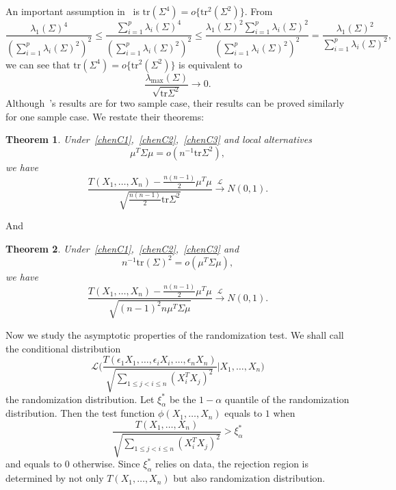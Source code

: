 \documentclass[review]{elsarticle}
\theoremstyle{plain}
\newtheorem{theorem}{\quad\quad Theorem}
\theoremstyle{definition}
\theoremstyle{remark}
\begin{document}
An important assumption in~\cite{Chen2010A} is
    $\mathrm{tr}(\Sigma^4)=o\{\mathrm{tr}^2(\Sigma^2)\}$.
    From
    $$
    \frac{\lambda_1(\Sigma)^4}{(\sum_{i=1}^p \lambda_i(\Sigma)^2)^2}
    \leq
    \frac{\sum_{i=1}^p\lambda_i(\Sigma)^4}{(\sum_{i=1}^p \lambda_i(\Sigma)^2)^2}
    \leq
    \frac{\lambda_1(\Sigma)^2\sum_{i=1}^p\lambda_i(\Sigma)^2}{(\sum_{i=1}^p \lambda_i(\Sigma)^2)^2}
    =
    \frac{\lambda_1(\Sigma)^2}{\sum_{i=1}^p \lambda_i(\Sigma)^2},
    $$
    we can see that 
    $\mathrm{tr}(\Sigma^4)=o\{\mathrm{tr}^2(\Sigma^2)\}$ is equivalent to
\begin{equation}\label{chenC3}
    \frac{\lambda_{\max}(\Sigma)}{\sqrt{\mathrm{tr}\Sigma^2}}\to 0.
\end{equation}
Although~\cite{Chen2010A}'s results are for two sample case, their results can be proved similarly for one sample case. We restate their theorems:
\begin{theorem}\label{theoremChen}
    Under~\eqref{chenC1},~\eqref{chenC2},~\eqref{chenC3} and local alternatives
    \begin{equation}\label{mu1}
        \mu^T \Sigma\mu=o(n^{-1}\mathrm{tr}\Sigma^2),
    \end{equation}
    we have
        $$
        \frac{T(X_1,\ldots,X_n)-\frac{n(n-1)}{2}\mu^T\mu}{\sqrt{\frac{n(n-1)}{2}\mathrm{tr}\Sigma^2}}\xrightarrow{\mathcal{L}}N(0,1).
        $$
\end{theorem}
And
\begin{theorem}\label{theoremChen2}
    Under~\eqref{chenC1},~\eqref{chenC2},~\eqref{chenC3} and     \begin{equation}\label{mumu1}
     n^{-1}\mathrm{tr}(\Sigma)^2   =o(\mu^T \Sigma\mu),
    \end{equation}
    we have
        $$
        \frac{T(X_1,\ldots,X_n)-\frac{n(n-1)}{2}\mu^T\mu}{\sqrt{{(n-1)}^2 n \mu^T \Sigma\mu}}\xrightarrow{\mathcal{L}}N(0,1).
        $$
\end{theorem}

Now we study the asymptotic properties of the randomization test.
We shall call the conditional distribution
        $$
        \mathcal{L}\Big(\frac{T(\epsilon_1 X_1,\ldots, \epsilon_i X_i,\ldots,\epsilon_n X_n)}{\sqrt{\sum_{1\leq j<i\leq n}{(X_i^T X_j)}^2}}\Big|X_1,\ldots,X_n\Big)
        $$
the randomization distribution.
Let $\xi^*_{\alpha}$ be the $1-\alpha$ quantile of the randomization distribution.
Then the test function $\phi(X_1,\ldots,X_n)$ equals to $1$ when 
$$
\frac{T(X_1,\ldots, X_n)}{\sqrt{\sum_{1\leq j<i\leq n}{(X_i^T X_j)}^2}}> \xi^*_{\alpha}
$$
and equals to $0$ otherwise.
Since $\xi^*_{\alpha}$ relies on data, the rejection region is determined by not only  $T(X_1,\ldots,X_n)$ but also randomization distribution.
\end{document}
